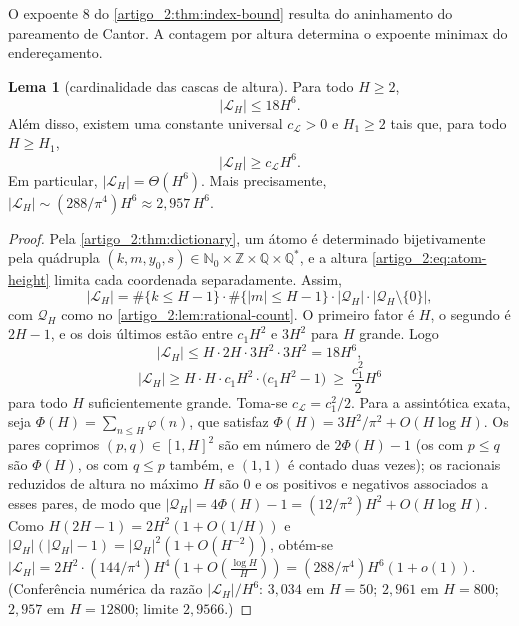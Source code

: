 \documentclass[12pt,a4paper]{article}
\theoremstyle{preciso}
\theoremstyle{definition}
\newcommand{\Nzero}{\mathbb{N}_0}
\newcommand{\Qstar}{\mathbb{Q}^{\!*}}
\newcommand{\Library}{\mathcal{L}}
\theoremstyle{preciso}
\theoremstyle{preciso}
\newtheorem{lemma}[teorema]{Lema}
\theoremstyle{preciso}
\theoremstyle{preciso}
\theoremstyle{definition}
\theoremstyle{preciso}
\theoremstyle{definition}
\theoremstyle{preciso}
\theoremstyle{preciso}
\theoremstyle{definition}
\begin{document}
O expoente $8$ do \cref{artigo_2:thm:index-bound} resulta do aninhamento do pareamento de Cantor. A contagem por altura determina o expoente minimax do endereçamento.

\begin{lemma}[cardinalidade das cascas de altura]\label{map:artigo_2:3.2}\label{artigo_2:lem:atom-count}
Para todo $H\ge2$,
\begin{equation}
 |\Library_H|\le18H^6.
 \label{artigo_2:eq:atom-count-upper}
\end{equation}
Além disso, existem uma constante universal $c_\Library>0$ e $H_1\ge2$ tais
que, para todo $H\ge H_1$,
\begin{equation}
 |\Library_H|\ge c_\Library H^6.
 \label{artigo_2:eq:atom-count}
\end{equation}
Em particular, $|\Library_H|=\Theta(H^6)$. Mais precisamente, $|\Library_H|\sim(288/\pi^4)H^6\approx2{,}957\,H^6$.
\end{lemma}

\begin{proof}
Pela \cref{artigo_2:thm:dictionary}, um átomo é determinado bijetivamente pela quádrupla $(k,m,y_0,s)\in\Nzero\times\mathbb{Z}\times\mathbb{Q}\times\Qstar$, e a altura \eqref{artigo_2:eq:atom-height} limita cada coordenada separadamente. Assim,
\[
 |\Library_H|=\#\{k\le H-1\}\cdot\#\{|m|\le H-1\}\cdot|\mathcal{Q}_H|\cdot|\mathcal{Q}_H\setminus\{0\}|,
\]
com $\mathcal{Q}_H$ como no \cref{artigo_2:lem:rational-count}. O primeiro fator é $H$, o segundo é $2H-1$, e os dois últimos estão entre $c_1H^2$ e $3H^2$ para $H$ grande. Logo
\[
 |\Library_H|\le H\cdot 2H\cdot 3H^2\cdot 3H^2=18H^6,
\]
\[
 |\Library_H|\ge H\cdot H\cdot c_1H^2\cdot\bigl(c_1H^2-1\bigr)\ \ge\ \frac{c_1^2}{2}H^6
\]
para todo $H$ suficientemente grande. Toma-se $c_\Library=c_1^2/2$. Para a assintótica exata, seja $\Phi(H)=\sum_{n\le H}\varphi(n)$, que satisfaz $\Phi(H)=3H^2/\pi^2+O(H\log H)$. Os pares coprimos $(p,q)\in[1,H]^2$ são em número de $2\Phi(H)-1$ (os com $p\le q$ são $\Phi(H)$, os com $q\le p$ também, e $(1,1)$ é contado duas vezes); os racionais reduzidos de altura no máximo $H$ são $0$ e os positivos e negativos associados a esses pares, de modo que $|\mathcal Q_H|=4\Phi(H)-1=(12/\pi^2)H^2+O(H\log H)$. Como $H(2H-1)=2H^2(1+O(1/H))$ e $|\mathcal Q_H|(|\mathcal Q_H|-1)=|\mathcal Q_H|^2(1+O(H^{-2}))$, obtém-se $|\Library_H|=2H^2\cdot(144/\pi^4)H^4(1+O(\tfrac{\log H}{H}))=(288/\pi^4)H^6(1+o(1))$. (Conferência numérica da razão $|\Library_H|/H^6$: $3{,}034$ em $H=50$; $2{,}961$ em $H=800$; $2{,}957$ em $H=12800$; limite $2{,}9566$.)
\end{proof}
\end{document}
